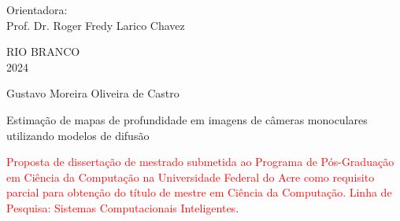 	\vskip1.50cm
	  \begin{center}
	    \small Orientadora: \\
	    Prof. Dr. {Roger Fredy Larico Chavez}\vskip3.5cm 
	  \end{center}
	  \begin{center}
	    \vspace{4mm}
	    RIO BRANCO \\
	    2024
	  \end{center}
	
	\thispagestyle{empty}
	\cleardoublepage
	\thispagestyle{empty}
	
	\vspace{-60mm}
	
	\begin{center}
	  {\large Gustavo Moreira Oliveira de Castro} \\
	  \vspace{7mm}
	
	  {\large Estimação de mapas de profundidade em imagens de câmeras monoculares utilizando modelos de difusão} \\
	  \vspace{10mm}
	\end{center}
	
	\noindent
	\begin{flushright}
	  \begin{minipage}[t]{8cm}
	
		\textcolor{red}{Proposta de dissertação de mestrado submetida ao Programa de Pós-Graduação em Ciência da Computação na Universidade Federal do Acre como requisito parcial para obtenção do título de mestre em Ciência da Computação. Linha de Pesquisa: Sistemas Computacionais Inteligentes}.
	
	  \end{minipage}
	\end{flushright}
	
	\vspace{1.0 cm}
	\noindent
	
